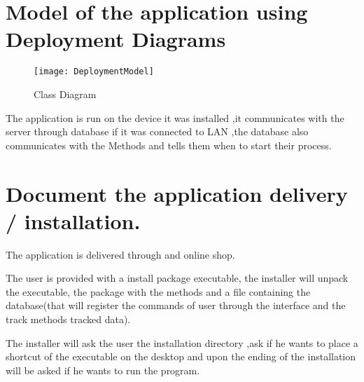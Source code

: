 
\setlength{\parindent}{2ex}
\section{Model of the application using Deployment Diagrams}
\par
\begin{figure}[h!]
	\centering
	\texttt{[image: DeploymentModel]}
	\caption{Class Diagram} 
\end{figure}
The application is run on the device it was installed ,it communicates with the server through database if it was connected to LAN ,the database also communicates with the Methods and tells them when to start their process.
\newpage
\section{Document the application delivery / installation.}
The application is delivered through and online shop.\par
The user is provided with a install package executable, the installer will unpack the executable, the package with the methods and a file containing the database(that will register the commands of user through the interface and the track methods tracked data).\par 
The installer will ask the user the installation directory ,ask if he wants to place a shortcut of the executable on the desktop and upon the ending of the installation will be asked if he wants to run the program.

\clearpage
